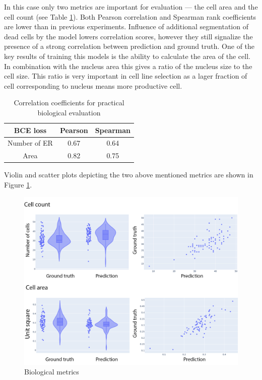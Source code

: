 In this case only two metrics are important for evaluation --- the cell area and the cell count (see Table \ref{table:gfp-metrics}). Both Pearson correlation and Spearman rank coefficients are lower than in previous experiments. Influence of additional segmentation of dead cells by the model lowers correlation scores, however they still signalize the presence of a strong correlation between prediction and ground truth. One of the key results of training this models is the ability to calculate the area of the cell. In combination with the nucleus area this gives a ratio of the nucleus size to the cell size. This ratio is very important in cell line selection as a lager fraction of cell corresponding to nucleus means more productive cell.

\begin{table}[H]
    \centering
    \caption{Correlation coefficients for practical biological evaluation}
        \begin{adjustbox}{width=0.4\textwidth}
            \begin{tabular}{|c|c|c|}\hline
                BCE loss&Pearson&Spearman
                \\\hline\hline
                Number of ER&0.67&0.64\\\hline
                Area&0.82&0.75\\\hline
            \end{tabular}
            \label{table:gfp-metrics}
        \end{adjustbox}
\end{table}

Violin and scatter plots depicting the two above mentioned metrics are shown in Figure \ref{fig:gfp-bce-metrics}.
\begin{figure}[H]
	\begin{center}
		\includegraphics[width=\linewidth]{bilder/gfp/binary-bce/gfp-bce-metrics.png}
		\caption{Biological metrics}\label{fig:gfp-bce-metrics}
	\end{center}
\end{figure}